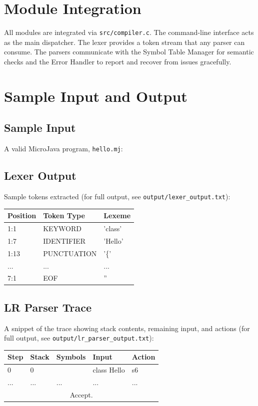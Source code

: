 \documentclass[12pt,a4paper]{article}
\begin{document}
\section{Module Integration}
All modules are integrated via \texttt{src/compiler.c}. The command-line interface acts as the main dispatcher. The lexer provides a token stream that any parser can consume. The parsers communicate with the Symbol Table Manager for semantic checks and the Error Handler to report and recover from issues gracefully.

\section{Sample Input and Output}

\subsection{Sample Input}
A valid MicroJava program, \texttt{hello.mj}:


\subsection{Lexer Output}
Sample tokens extracted (for full output, see \texttt{output/lexer\_output.txt}):
\begin{table}[ht]
\centering
\begin{tabular}{|l|l|l|}
\hline
\textbf{Position} & \textbf{Token Type} & \textbf{Lexeme} \\
\hline
1:1  & KEYWORD     & 'class' \\
1:7  & IDENTIFIER  & 'Hello' \\
1:13 & PUNCTUATION & '\{' \\
...  & ...         & ... \\
7:1  & EOF         & '' \\
\hline
\end{tabular}
\end{table}

\subsection{LR Parser Trace}
A snippet of the trace showing stack contents, remaining input, and actions (for full output, see \texttt{output/lr\_parser\_output.txt}):
\begin{table}[ht]
\centering
\begin{tabular}{|l|l|l|l|l|}
\hline
\textbf{Step} & \textbf{Stack} & \textbf{Symbols} & \textbf{Input} & \textbf{Action} \\
\hline
0 & 0 & & class Hello & s6 \\
... & ... & ... & ... & ... \\
\multicolumn{5}{|c|}{Accept.} \\
\hline
\end{tabular}
\end{table}
\end{document}
